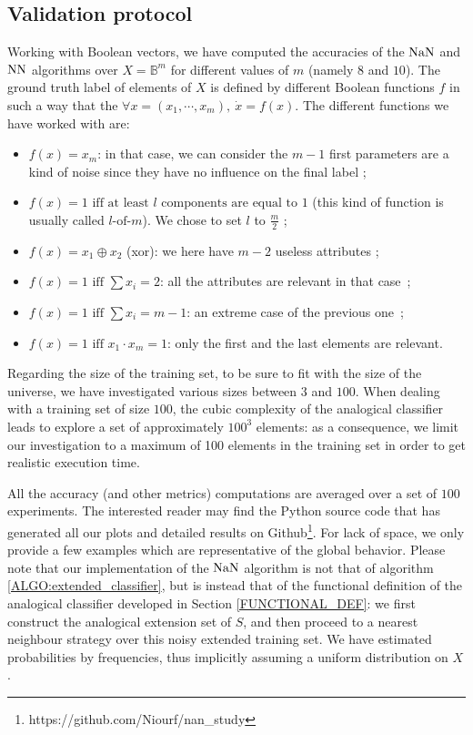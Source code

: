 \subsection{Validation protocol}
Working with Boolean vectors, we have computed the accuracies of the $\mbox{NaN}$ and
$\mbox{NN}$ algorithms over $X=\mathbb{B}^m$ for different values of $m$ (namely $8$
and $10$). The ground truth label of elements of $X$ is
defined by different Boolean functions $f$ in such a way that the $\forall x =
(x_1, \cdots, x_m), ~ \dot{x} = f(x)$. The different functions we have worked
with are:
\begin{itemize}
\item $f(x)=x_m$: in that case, we can consider the $m-1$ first
  parameters are a kind of noise since they have no influence on the final
  label ;
\item $f(x) = 1 \mbox{ iff at least } l  \mbox{ components are equal
  to } 1$ (this kind of function is usually called $l\text{-of-}m$). We chose
  to set $l$ to $\frac{m}{2}$ ;
\item $f(x)= x_1 \oplus  x_2$ (xor): we here have $m-2$ useless attributes ;
\item $f(x)=1 \mbox { iff } \sum x_i =2$: all the attributes are relevant in
  that case~;
\item $f(x)=1 \mbox { iff } \sum x_i = m-1$: an extreme case of
  the previous one~;
\item $f(x)=1 \mbox { iff } x_1 \cdot x_m = 1$: only the first and
  the last elements are relevant.
\end{itemize}

Regarding the size of the training set, to be sure to fit with the size of the
universe, we have investigated various sizes between $3$ and $100$. When
dealing with a training set of size $100$, the cubic complexity of the
analogical classifier leads to explore a set of approximately $100^3$ elements:
as a consequence, we limit our investigation to a maximum of 100 elements in
the training set in order to get realistic execution time.

All the accuracy (and other metrics) computations are averaged over a set of
$100$ experiments.  The interested reader may find the Python source code that
has generated all our plots and detailed results on
Github\footnote{https://github.com/Niourf/nan\_study}. For lack of space,
we only provide a few examples which are representative of the global behavior.
Please note that our implementation of the $\mbox{NaN}$ algorithm is not that of
algorithm \ref{ALGO:extended_classifier}, but is instead that of the functional definition
of the analogical classifier developed in Section \ref{FUNCTIONAL_DEF}: we
first construct the analogical extension set of $S$, and then proceed to a
nearest neighbour strategy over this noisy extended training set. We have
estimated probabilities by frequencies, thus implicitly assuming a uniform
distribution on $X$.

